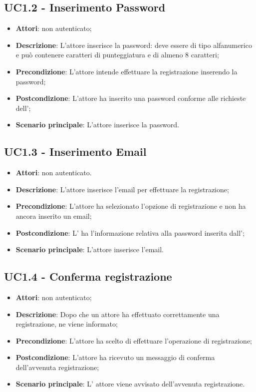 \subsection{UC1.2 - Inserimento Password}
\label{ssec:UC1.2}
\begin{itemize}
\item \textbf{Attori}:  non autenticato;
\item \textbf{Descrizione}: L’attore inserisce la password: deve essere di tipo alfanumerico e può contenere caratteri di punteggiatura e di almeno 8 caratteri;
\item \textbf{Precondizione}: L'attore intende effettuare la registrazione inserendo la password;
\item \textbf{Postcondizione}: L'attore ha inserito una password conforme alle richieste dell';
\item \textbf{Scenario principale}: L'attore inserisce la password.
\end{itemize}
\subsection{UC1.3 - Inserimento Email}
\label{ssec:UC1.3}
\begin{itemize}
\item \textbf{Attori}:  non autenticato.
\item \textbf{Descrizione}: L’attore inserisce l'email per effettuare la registrazione;
\item \textbf{Precondizione}: L'attore ha selezionato l'opzione di registrazione e non ha ancora inserito un email;
\item \textbf{Postcondizione}: L' ha l’informazione relativa alla password inserita dall’;
\item \textbf{Scenario principale}: L'attore inserisce l'email.
\end{itemize}
\newpage
\subsection{UC1.4 - Conferma registrazione}
\label{ssec:UC1.4}
\begin{itemize}
\item \textbf{Attori}:  non autenticato;
\item \textbf{Descrizione}: Dopo che un attore ha effettuato correttamente una registrazione, ne viene informato;
\item \textbf{Precondizione}: L'attore ha scelto di effettuare l'operazione di registrazione;
\item \textbf{Postcondizione}: L'attore ha ricevuto un messaggio di conferma dell'avvenuta registrazione;
\item \textbf{Scenario principale}: L' attore viene avvisato dell'avvenuta registrazione.
\end{itemize}

